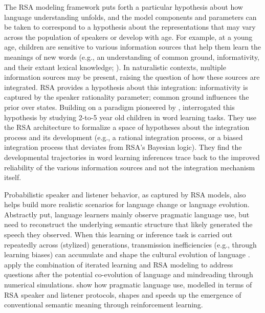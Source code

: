 \documentclass{sp}
\begin{document}
The RSA modeling framework puts forth a particular hypothesis about how language understanding unfolds, and the model components and parameters can be taken to correspond to a hypothesis about the representations that may vary across the population of speakers or develop with age.
For example, at a young age, children are sensitive to various information sources that help them learn the meanings of new words (e.g., an understanding of common ground, informativity, and their extant lexical knowledge; \citealp{markman1988children, schulze2013, akhtar1996role}).
In naturalistic contexts, multiple information sources may be present, raising the question of how these sources are integrated.
RSA provides a hypothesis about this integration: informativity is captured by the speaker rationality parameter; common ground influences the prior over states.
Building on a paradigm pioneered by \cite{frank2014inferring},
\cite{bohn2019predicting, bohn2019integrating} interrogated this hypothesis by studying 2-to-5 year old children in word learning tasks. 
They use the RSA architecture to formalize a space of hypotheses about the integration process and its development (e.g., a rational integration process, or a biased integration process that deviates from RSA's Bayesian logic).
They find the developmental trajectories in word learning inferences trace back to the improved reliability of the various information sources and not the integration mechanism itself.

Probabilistic speaker and listener behavior, as captured by RSA models, also helps build more realistic scenarios for language change or language evolution.
Abstractly put, language learners mainly observe pragmatic language use, but need to reconstruct the underlying semantic structure that likely generated the speech they observed.
When this learning or inference task is carried out repeatedly across (stylized) generations, transmission inefficiencies (e.g., through learning biases) can accumulate and shape the cultural evolution of language \citep[e.g.][]{BrochhagenFranke2017:Co-evolution-of,CarcassiSchwoustra2019:The-evolution-o,Carcassi2020:The-cultural-ev}.
\citet{WoensdregtCummins2020:A-computational} apply the combination of iterated learning and RSA modeling to address questions after the potential co-evolution of language and mindreading through numerical simulations.
\citet{OhmerKonig2020:Reinforcement-o} show how pragmatic language use, modelled in terms of RSA speaker and listener protocols, shapes and speeds up the emergence of conventional semantic meaning through reinforcement learning.
\end{document}
